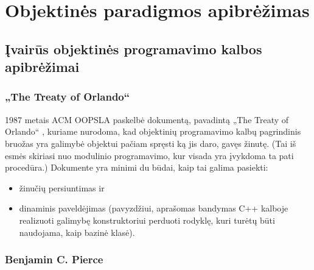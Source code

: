 \chapter{Objektinės paradigmos apibrėžimas}

\section{Įvairūs objektinės programavimo kalbos apibrėžimai}

\subsection{„The Treaty of Orlando“}

1987 metais ACM OOPSLA paskelbė dokumentą, pavadintą „The Treaty of
Orlando“ \cite{Lieberman:1987:TO:62139.62144}, kuriame nurodoma, kad
objektinių programavimo kalbų pagrindinis bruožas yra galimybė objektui
pačiam spręsti ką jis daro, gavęs žinutę. (Tai iš esmės skiriasi nuo
modulinio programavimo, kur visada yra įvykdoma ta pati procedūra.)
Dokumente yra minimi du būdai, kaip tai galima pasiekti:
\begin{itemize}
  \item žinučių persiuntimas  ir
  \item dinaminis paveldėjimas  (pavyzdžiui,
    \cite[272]{cpp-design-evolution} aprašomas bandymas C++
    kalboje realizuoti galimybę konstruktoriui perduoti rodyklę, kuri
    turėtų būti naudojama, kaip bazinė klasė).
\end{itemize}

\subsection{Benjamin C. Pierce}

